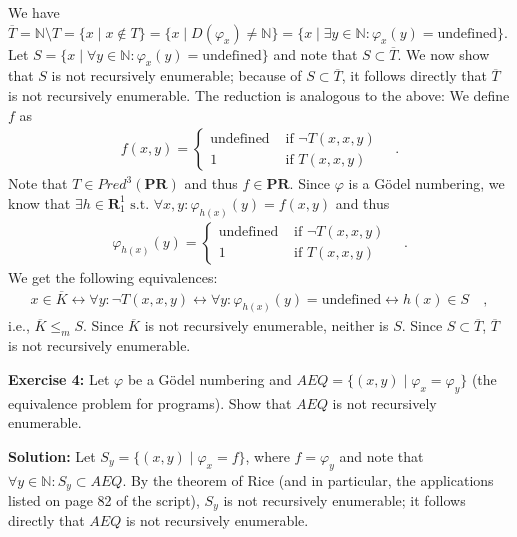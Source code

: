 \documentclass [11pt]{article}
\newcommand{\N}{\ensuremath{\mathbb{N}}}
\newcommand{\PR}{\textbf{PR}}
\newcommand{\R}{\textbf{R}}
\newcommand{\lra}{\ensuremath{\leftrightarrow}}
\begin{document}
We have $\overline{T} = \N\setminus T = \{x\mid x \not \in T \} = \{x\mid D(\varphi_x) \neq \N\} = \{x \mid \exists y \in \N: \varphi_x(y) = \text{undefined}\}$. 
Let $S = \{x\mid \forall y\in \N: \varphi_x(y) = \text{undefined}\}$ and note that $S \subset \overline{T}$.
We now show that $S$ is not recursively enumerable; because of $S \subset \overline{T}$, it follows directly that $\overline{T}$ is not recursively enumerable.
The reduction is analogous to the above:
We define $f$ as 
\begin{align*}
 f(x,y) = \begin{cases}
           \text{undefined} & \text{ if } \neg T(x,x,y) \\
           1 &\text{ if } T(x,x,y)
          \end{cases} \quad .
\end{align*} 
Note that $T \in Pred^3(\PR)$ and thus $f \in \PR$.
Since $\varphi$ is a G\"odel numbering, we know that $\exists h \in \R_1^1 \text{ s.t.\ } \forall x,y :\varphi_{h(x)}(y) = f(x,y)$ and thus
\begin{align*}
\varphi_{h(x)}(y) = \begin{cases}
           \text{undefined} & \text{ if } \neg T(x,x,y) \\
           1 &\text{ if } T(x,x,y)
          \end{cases} \quad .
\end{align*} 
We get the following equivalences:
\begin{align*}
x\in \overline{K} \lra \forall y: \neg T(x,x,y) \lra \forall y: \varphi_{h(x)}(y) = \text{undefined} \lra h(x) \in S \quad , 
\end{align*}
i.e., $\overline{K} \leq_m S$. 
Since $\overline{K}$ is not recursively enumerable, neither is $S$.
Since $S \subset \overline{T}$, $\overline{T}$ is not recursively enumerable.

\bigskip
\noindent
\textbf{Exercise 4:} Let $\varphi$ be a G\"odel numbering and $AEQ = \{(x,y) \mid \varphi_x = \varphi_y \}$ (the equivalence problem for programs). Show that $AEQ$ is not recursively enumerable.

\noindent
\textbf{Solution:}
Let $S_y = \{ (x,y) \mid \varphi_x = f \}$, where $f = \varphi_y$ and note that $\forall y\in \N: S_y \subset AEQ$.
By the theorem of Rice (and in particular, the applications listed on page 82 of the script),  $S_y$ is not recursively enumerable; it follows directly that $AEQ$ is not recursively enumerable.
\end{document}
